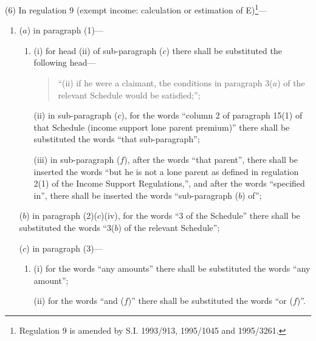\documentclass[a4paper]{article}
\begin{document}
(6) In regulation 9 (exempt income: calculation or estimation of E)\footnote{\frenchspacing Regulation 9 is amended by S.I. 1993/913, 1995/1045 and 1995/3261.}---

\begin{enumerate}\item[]
($a$) in paragraph (1)—
\begin{enumerate}\item[]
(i) for head (ii) of sub-paragraph ($c$) there shall be substituted the following head—
\begin{quotation}
“(ii) if he were a claimant, the conditions in paragraph 3($a$) of the relevant Schedule would be satisfied;”;
\end{quotation}

(ii) in sub-paragraph ($c$), for the words “column 2 of paragraph 15(1) of that Schedule (income support lone parent premium)” there shall be substituted the words “that sub-paragraph”;

(iii) in sub-paragraph ($f$), after the words “that parent”, there shall be inserted the words “but he is not a lone parent as defined in regulation 2(1) of the Income Support Regulations,”, and  after the words “specified in”, there shall be inserted the words “sub-paragraph ($b$) of”;
\end{enumerate}

($b$) in paragraph (2)($c$)(iv), for the words “3 of the Schedule” there shall be substituted the words “3($b$) of the relevant Schedule”;

($c$) in paragraph (3)—
\begin{enumerate}\item[]
(i) for the words “any amounts” there shall be substituted the words “any amount”;

(ii) for the words “and ($f$)” there shall be substituted the words “or ($f$)”.
\end{enumerate}
\end{enumerate}
\end{document}
